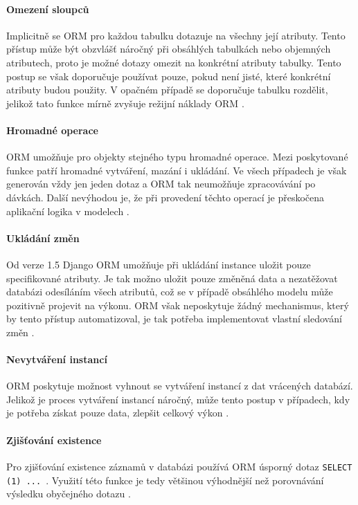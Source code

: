\documentclass[ing,male,java,dept456]{diploma}						%
\begin{document}
\paragraph{Omezení sloupců}

Implicitně se ORM pro každou tabulku dotazuje na všechny její atributy. Tento přístup může být obzvlášť náročný při obsáhlých tabulkách nebo objemných atributech, proto je možné dotazy omezit na konkrétní atributy tabulky. Tento postup se však doporučuje používat pouze, pokud není jisté, které konkrétní atributy budou použity. V opačném případě se doporučuje tabulku rozdělit, jelikož tato funkce mírně zvyšuje režijní náklady ORM \cite{dj-defer}.

\paragraph{Hromadné operace}

ORM umožňuje pro objekty stejného typu hromadné operace. Mezi poskytované funkce patří hromadné vytváření, mazání i ukládání. Ve všech případech je však generován vždy jen jeden dotaz a ORM tak neumožňuje zpracovávání po dávkách. Další nevýhodou je, že při provedení těchto operací je přeskočena aplikační logika v modelech \cite{dj-bulk}.

\paragraph{Ukládání změn} Od verze 1.5 Django ORM umožňuje při ukládání instance uložit pouze specifikované atributy. Je tak možno uložit pouze změněná data a nezatěžovat databázi odesíláním všech atributů, což se v případě obsáhlého modelu může pozitivně projevit na výkonu. ORM však neposkytuje žádný mechanismus, který by tento přístup automatizoval, je tak potřeba implementovat vlastní sledování změn \cite{dj-save}.

\paragraph{Nevytváření instancí} ORM poskytuje možnost vyhnout se vytváření instancí z dat vrácených databází. Jelikož je proces vytváření instancí náročný, může tento postup v případech, kdy je potřeba získat pouze data, zlepšit celkový výkon \cite{dj-values}.

\paragraph{Zjišťování existence} Pro zjišťování existence záznamů v databázi používá ORM úsporný dotaz \lstinline[style=customsql]|SELECT (1) ... |. Využití této funkce je tedy většinou výhodnější než porovnávání výsledku obyčejného dotazu \cite{dj-exists}.
\end{document}
